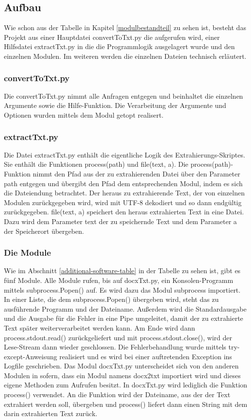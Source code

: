 \documentclass[12pt]{scrartcl}
\begin{document}
\subsection{Aufbau}
\label{sec:technical-background-aufbau}
Wie schon aus der Tabelle in Kapitel \ref{modulbestandteil} zu sehen ist, besteht das Projekt aus einer Hauptdatei convertToTxt.py die aufgerufen wird, einer Hilfsdatei extractTxt.py in die die Programmlogik ausgelagert wurde und den einzelnen Modulen.
Im weiteren werden die einzelnen Dateien technisch erläutert.
\subsubsection{convertToTxt.py}
\label{sec:technical-background-convertToTxt}
Die convertToTxt.py nimmt alle Anfragen entgegen und beinhaltet die einzelnen Argumente sowie die Hilfe-Funktion.
Die Verarbeitung der Argumente und Optionen wurden mittels dem Modul getopt realisert.
\subsubsection{extractTxt.py}
\label{sec:technical-background-extractTxt}
Die Datei extractTxt.py enthält die eigentliche Logik des Extrahierungs-Skriptes. Sie enthält die Funktionen process(path) und file(text, a).
Die process(path)-Funktion nimmt den Pfad aus der zu extrahierenden Datei über den Parameter path entgegen und übergibt den Pfad dem entsprechenden Modul, indem es sich die Dateiendung betrachtet. 
Der heraus zu extrahierende Text, der von einzelnen Modulen zurückgegeben wird, wird mit UTF-8 dekodiert und so dann endgültig zurückgegeben. 
file(text, a) speichert den heraus extrahierten Text in eine Datei. Dazu wird dem Parameter text der zu speichernde Text und dem Parameter a der Speicherort übergeben. 
\subsubsection{Die Module}
\label{sec:technical-background-module}
Wie im Abschnitt \ref{additional-software-table} in der Tabelle zu sehen ist, gibt es fünf Module. Alle Module rufen, bis auf docxTxt.py, ein Konsolen-Programm mittels subprocess.Popen() auf.
Es wird dazu das Modul subprocess importiert. In einer Liste, die dem subprocess.Popen() übergeben wird, steht das zu ausführende Programm und der Dateiname. Außerdem wird die Standardausgabe und die Ausgabe für die Fehler in eine Pipe umgeleitet, damit der zu extrahierte Text später weiterverarbeitet werden kann. Am Ende wird dann process.stdout.read() zurückgeliefert und mit process.stdout.close(), wird der Lese-Stream dann wieder geschlossen.
Die Fehlerbehandlung wurde mittels try-except-Anweisung realisiert und es wird bei einer auftretenden Exception ins Logfile geschrieben. 
\newline
Das Modul docxTxt.py unterscheidet sich von den anderen Modulen in sofern, dass ein Modul namens docx2txt importiert wird und dieses eigene Methoden zum Aufrufen besitzt. In docxTxt.py wird lediglich die Funktion process() verwendet. 
An die Funktion wird der Dateiname, aus der der Text extrahiert werden soll, übergeben und process() liefert dann einen String mit dem darin extrahierten Text zurück. 
\newpage
\end{document}
